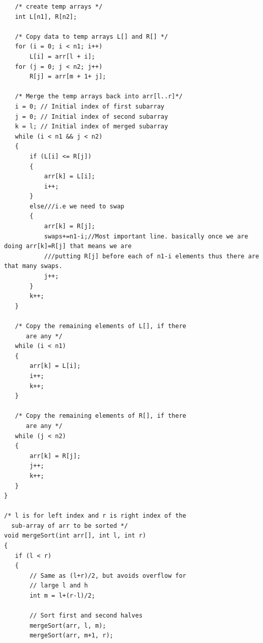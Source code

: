 \documentclass[8pt, a4paper, oneside, twocolumn]{extarticle}
\begin{document}
\begin{itemize}
\begin{verbatim}
   /* create temp arrays */
   int L[n1], R[n2];

   /* Copy data to temp arrays L[] and R[] */
   for (i = 0; i < n1; i++)
       L[i] = arr[l + i];
   for (j = 0; j < n2; j++)
       R[j] = arr[m + 1+ j];

   /* Merge the temp arrays back into arr[l..r]*/
   i = 0; // Initial index of first subarray
   j = 0; // Initial index of second subarray
   k = l; // Initial index of merged subarray
   while (i < n1 && j < n2)
   {
       if (L[i] <= R[j])
       {
           arr[k] = L[i];
           i++;
       }
       else///i.e we need to swap
       {
           arr[k] = R[j];
           swaps+=n1-i;//Most important line. basically once we are doing arr[k]=R[j] that means we are
           ///putting R[j] before each of n1-i elements thus there are that many swaps.
           j++;
       }
       k++;
   }

   /* Copy the remaining elements of L[], if there
      are any */
   while (i < n1)
   {
       arr[k] = L[i];
       i++;
       k++;
   }

   /* Copy the remaining elements of R[], if there
      are any */
   while (j < n2)
   {
       arr[k] = R[j];
       j++;
       k++;
   }
}

/* l is for left index and r is right index of the
  sub-array of arr to be sorted */
void mergeSort(int arr[], int l, int r)
{
   if (l < r)
   {
       // Same as (l+r)/2, but avoids overflow for
       // large l and h
       int m = l+(r-l)/2;

       // Sort first and second halves
       mergeSort(arr, l, m);
       mergeSort(arr, m+1, r);


\end{verbatim}
\end{itemize}
\end{document}
